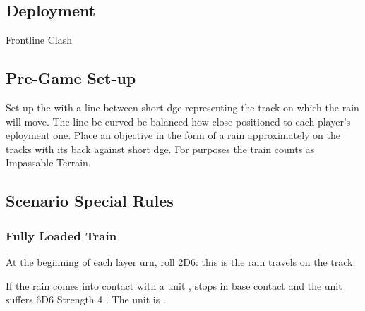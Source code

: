 
\label{RunawayTrain}


\subsection*{Deployment}

 Frontline Clash


\subsection*{Pre-Game Set-up}

Set up the  with a line between  short dge representing the track on which the rain will move. The line  be curved be balanced  how close  positioned to each player's eployment one. Place an objective in the form of a rain  approximately  on the tracks with its back against  short dge. For  purposes\rewordedrule{,} the train counts as Impassable Terrain.

\subsection*{Scenario Special Rules}

\subsubsection*{Fully Loaded Train}

At the beginning of each layer urn, roll 2D6: this is  the rain travels  on the track.

If the rain comes into contact with a unit ,  stops \rewordedrule{(}in base contact and the unit suffers 6D6  Strength 4 . The unit is .

